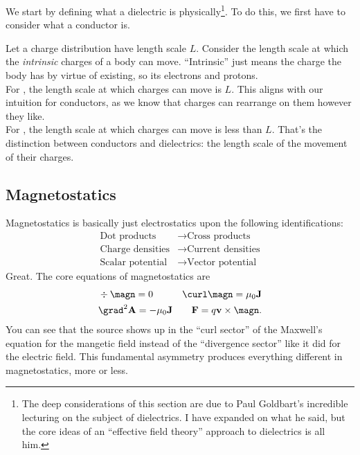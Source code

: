 \documentclass[11pt]{article}
\begin{document}
We start by defining what a dielectric is physically\footnote{The
deep considerations of this section are due to Paul Goldbart's
incredible lecturing on the subject of dielectrics. I have expanded
on what he said, but the core ideas of an ``effective field theory''
approach to dielectrics is all him.}. To do this, we first have
to consider what a conductor is.

\begin{iidea}
    Let a charge distribution have length scale $L$.
    Consider the length scale at which the \emph{intrinsic} charges of a body
    can move. ``Intrinsic'' just means the charge the body has by virtue of existing,
    so its electrons and protons.\\

    For , the length scale at which charges can move is $L$.
    This aligns with our intuition for conductors, as we know that charges
    can rearrange on them however they like.\\

    For , the length scale at which charges can move is less
    than $L$. That's the distinction between conductors and dielectrics:
    the length scale of the movement of their charges.
\end{iidea}

\subsection{Magnetostatics}


Magnetostatics is basically just electrostatics
upon the following identifications:
\begin{align*}
    \text{Dot products} & \longrightarrow \text{Cross products}\\
    \text{Charge densities} & \longrightarrow \text{Current densities}\\
    \text{Scalar potential} & \longrightarrow \text{Vector potential}
\end{align*}
Great. The core equations of magnetostatics are
\begin{align*}
    & \div \magn = 0 & \curl \magn = \mu_0 \mathbf{J}\\
    & \grad^2 \mathbf{A} = - \mu_0 \mathbf{J} & \mathbf{F} = q \mathbf{v} \times \magn.
\end{align*}
You can see that the source shows up in the ``curl sector'' of
the Maxwell's equation for the mangetic field instead of the ``divergence sector''
like it did for the electric field. This fundamental
asymmetry produces everything different in magnetostatics,
more or less.
\end{document}
